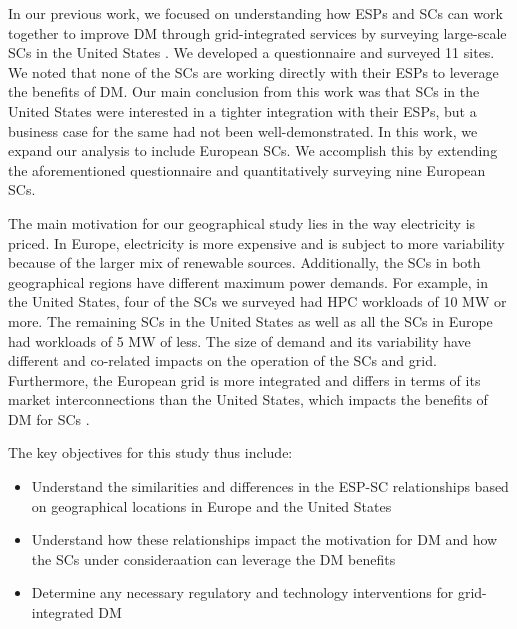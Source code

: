 In our previous work, we focused on understanding how ESPs and SCs can work together to improve DM through grid-integrated services by surveying large-scale SCs in the United States \cite{BatesESP}. We developed a questionnaire and surveyed 11 sites. We noted that none of the SCs are working directly with their ESPs to leverage the benefits of DM. Our main conclusion from this work was that SCs in the United States were interested in a tighter integration with their ESPs, but a business case for the same had not been well-demonstrated. In this work, we expand our analysis to include European SCs. We accomplish this by extending the aforementioned questionnaire and quantitatively surveying nine European SCs. 


The main motivation for our geographical study lies in the way electricity is priced. In Europe, electricity is more expensive and is subject to more variability because of the larger mix of renewable sources. Additionally, the SCs in both geographical regions have different maximum power demands. For example, in the United States, four of the SCs we surveyed had HPC workloads of 10 MW or more. The remaining SCs in the United States as well as all the SCs in Europe had workloads of 5 MW of less. The size of demand and its variability have different and co-related impacts on the operation of the SCs and grid. Furthermore, the European grid is more integrated and differs in terms of its market interconnections than the United States, which impacts the benefits of DM for SCs \cite{clausen2014load}. 

The key objectives for this study thus include:

\begin{itemize}
\item{Understand the similarities and differences in the ESP-SC relationships based on geographical locations in Europe and the United States}
\item{Understand how these relationships impact the motivation for DM and how the SCs under consideraation can leverage the DM benefits}
\item{Determine any necessary regulatory and technology interventions for grid-integrated DM}
\end{itemize}

